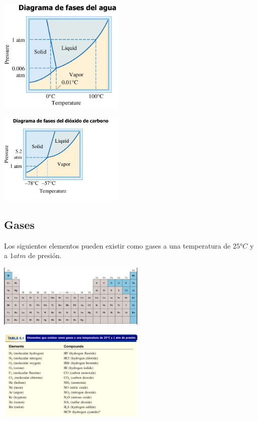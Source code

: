             \begin{center} \includegraphics[width=6cm]{./imagenes/diagramaDeFasesDelAgua.png} \end{center}
            \begin{center} \includegraphics[width=6cm]{./imagenes/diagramaDeFasesDelCO2.png} \end{center}
    \subsection{Gases}
        \sangria{} Los siguientes elementos pueden existir como gases a una temperatura de $\ang{25}C$ y a $1atm$ de presión.
        \begin{center} \includegraphics[width=7cm]{./imagenes/elementosGasACondNormales.png} \end{center}
        \saltoPag{}
        \begin{center} \includegraphics[width=7cm]{./imagenes/elementosGasACondNormales1.png} \end{center}
